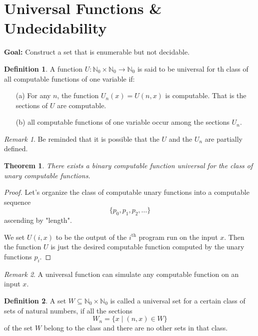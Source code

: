 \documentclass[10pt, letterpaper]{article}
\newcommand{\N}{\mathbb{N}}
\newtheorem{thm}{Theorem}
\theoremstyle{remark}
\newtheorem{rem}{Remark}
\theoremstyle{definition}
\newtheorem{defn}{Definition}
\begin{document}
    \section*{Universal Functions \& Undecidability}

    \textbf{Goal: } Construct a set that is enumerable but not decidable.

    \begin{defn}
        A function $U:\N_0 \times \N_0 \rightarrow \N_0$ is said to be universal for th class of all computable functions of one 
        variable if:
        \begin{enumerate}
            \item [(a)] For any $n$, the function $U_n(x) = U(n,x)$ is computable. That is the sections of $U$ are computable.
            \item [(b)] all computable functions of one variable occur among the sections $U_n$.
        \end{enumerate}
    \end{defn}

    \begin{rem}
        Be reminded that it is possible that the $U$ and the $U_n$ are partially defined.
    \end{rem}

    \begin{thm}
        There exists a binary computable function universal for the class of unary computable functions.
    \end{thm}

    \begin{proof}
        Let's organize the class of computable unary functions into a computable sequence
        \[
            \{p_0, p_1, p_2, \ldots \}
        \]
        ascending by "length".

        We set $U(i,x)$ to be the output of the $i^{\text{th}}$ program run on the input $x$. Then the function $U$
        is just the desired computable function computed by the unary functions $p_i$.
    \end{proof}

    \begin{rem}
        A universal function can simulate any computable function on an input $x$.
    \end{rem}

    \begin{defn}
        A set $W \subseteq \N_0 \times \N_0$ is called a universal set for a certain class of sets of natural numbers, if all the sections 
        \[
            W_n = \{x \mid (n,x) \in W \}
        \]
        of the set $W$ belong to the class and there are no other sets in that class.
    \end{defn}
\end{document}
